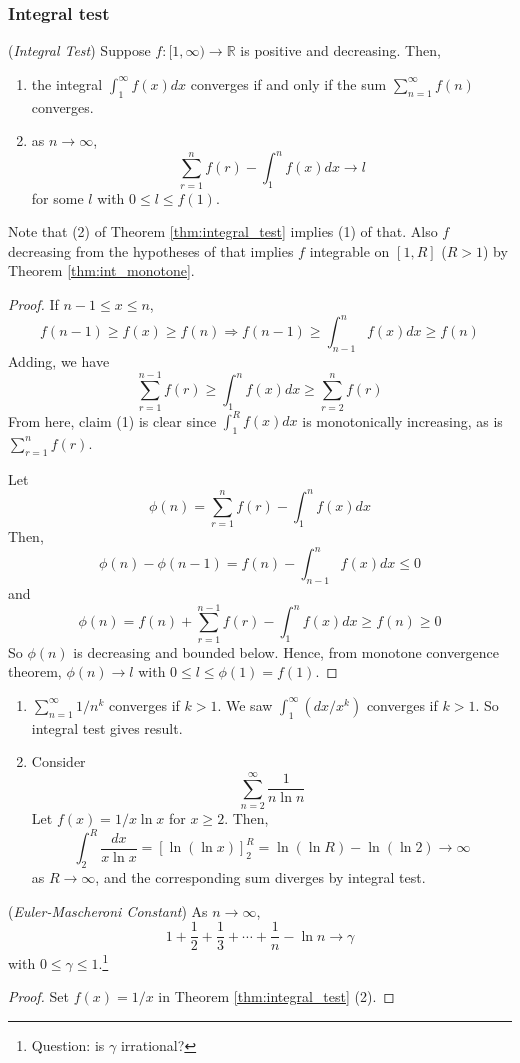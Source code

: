 \documentclass[10pt, a4paper, twoside]{report}
\begin{document}
\subsubsection{Integral test}
\begin{theorem}
    (\emph{Integral Test}) Suppose \(f:[1,\infty)\to\mathbb{R}\) is positive and decreasing. Then,
    \begin{enumerate}
        \item the integral \(\int_1^\infty f(x)dx\) converges if and only if the sum \(\sum_{n=1}^\infty f(n)\) converges.
        \item as \(n\to\infty\),
        \[\sum_{r=1}^{n}f(r)-\int_1^nf(x)dx\to l\]
        for some \(l\) with \(0\leq l\leq f(1)\).
    \end{enumerate}
    \label{thm:integral_test}
\end{theorem}
Note that (2) of Theorem \ref{thm:integral_test} implies (1) of that. Also \(f\) decreasing from the hypotheses of that implies \(f\) integrable on \([1,R]\) (\(R>1\)) by Theorem \ref{thm:int_monotone}.
\begin{proof} If \(n-1\leq x\leq n\),
        \[f(n-1)\geq f(x)\geq f(n)\Rightarrow f(n-1)\geq\int_{n-1}^nf(x)dx\geq f(n)\]
        Adding, we have 
        \[\sum_{r=1}^{n-1}f(r)\geq\int_1^nf(x)dx\geq\sum_{r=2}^{n}f(r)\] From here, claim (1) is clear since \(\int_1^Rf(x)dx\) is monotonically increasing, as is \(\sum_{r=1}^nf(r)\).

        Let 
        \[\phi(n)=\sum_{r=1}^{n}f(r)-\int_1^nf(x)dx\]
        Then,
        \[\phi(n)-\phi(n-1)=f(n)-\int_{n-1}^nf(x)dx\leq 0\]
        and 
        \[\phi(n)=f(n)+\sum_{r=1}^{n-1}f(r)-\int_1^nf(x)dx\geq f(n)\geq 0\]
        So \(\phi(n)\) is decreasing and bounded below. Hence, from monotone convergence theorem, \(\phi(n)\to l\) with \(0\leq l\leq\phi(1)=f(1)\).
\end{proof}
\begin{example} \item[]
    \begin{enumerate}
        \item \(\sum_{n=1}^\infty 1/n^k\) converges if \(k>1\). We saw \(\int_1^\infty(dx/x^k)\) converges if \(k>1\). So integral test gives result.
        \item Consider 
        \[\sum_{n=2}^{\infty}\frac{1}{n\ln n}\]
        Let \(f(x)=1/x\ln x\) for \(x\geq 2\). Then,
        \[\int_2^R\frac{dx}{x\ln x}=\left[\ln(\ln x)\right]_2^R=\ln(\ln R)-\ln(\ln 2)\to\infty\]
        as \(R\to \infty\), and the corresponding sum diverges by integral test.
    \end{enumerate}
\end{example}
\begin{corollary}
    (\emph{Euler-Mascheroni Constant}) As \(n\to\infty\),
    \[1+\frac 12+\frac 13+\cdots+\frac 1n-\ln n\to\gamma\]
    with \(0\leq\gamma\leq 1\).\footnote{Question: is \(\gamma\) irrational?}
\end{corollary}
\begin{proof}
    Set \(f(x)=1/x\) in Theorem \ref{thm:integral_test} (2).
\end{proof}
\end{document}

